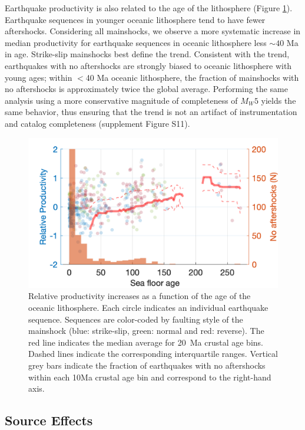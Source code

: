 \documentclass[draft, jgrga]{agujournal2018}
\begin{document}
    Earthquake productivity is also related to the age of the lithosphere  (Figure \ref{fig:prod_vs_age}). Earthquake sequences in younger oceanic lithosphere tend to have fewer aftershocks. Considering all mainshocks, we observe a more systematic increase in median productivity for earthquake sequences in oceanic lithosphere less $\sim 40$ Ma in age. Strike-slip mainshocks best define the trend. Consistent with the trend, earthquakes with no aftershocks are strongly biased to oceanic lithosphere with young ages; within $<$40 Ma oceanic lithosphere, the fraction of mainshocks with no aftershocks is approximately twice the global average. Performing the same analysis using a more conservative magnitude of completeness of $M_W5$ yields the same behavior, thus ensuring that the trend is not an artifact of instrumentation and catalog completeness (supplement Figure S11).

    \begin{figure}
        \centering
        \includegraphics{prod_vs_age.png}
        \caption{Relative productivity increases as a function of the age of the oceanic lithosphere. Each circle indicates an individual earthquake sequence. Sequences are color-coded by faulting style of the mainshock (blue: strike-slip, green: normal and red: reverse). The red line indicates the median average for 20~Ma crustal age bins. Dashed lines indicate the corresponding interquartile ranges. Vertical grey bars indicate the fraction of earthquakes with no aftershocks within each 10Ma crustal age bin and correspond to the right-hand axis.}
        \label{fig:prod_vs_age}
    \end{figure}

    \subsection{Source Effects}\label{sec:source_parameters}
\end{document}

